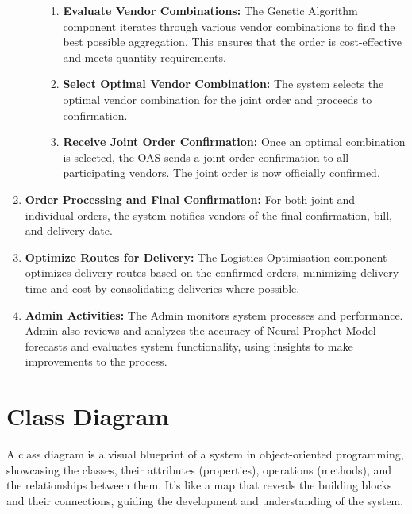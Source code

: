 \begin{enumerate}
\begin{itemize}
\begin{enumerate}
                        \item \textbf{Evaluate Vendor Combinations:} The Genetic Algorithm component iterates through various vendor combinations to find the best possible aggregation. This ensures that the order is cost-effective and meets quantity requirements.
                        \item \textbf{Select Optimal Vendor Combination:} The system selects the optimal vendor combination for the joint order and proceeds to confirmation.
                        \item \textbf{Receive Joint Order Confirmation:} Once an optimal combination is selected, the OAS sends a joint order confirmation to all participating vendors. The joint order is now officially confirmed.
                    \end{enumerate}
          \end{itemize}
    \item \textbf{Order Processing and Final Confirmation:} For both joint and individual orders, the system notifies vendors of the final confirmation, bill, and delivery date.
    \item \textbf{Optimize Routes for Delivery:} The Logistics Optimisation component optimizes delivery routes based on the confirmed orders, minimizing delivery time and cost by consolidating deliveries where possible.
    \item \textbf{Admin Activities:} The Admin monitors system processes and performance. Admin also reviews and analyzes the accuracy of Neural Prophet Model forecasts and evaluates system functionality, using insights to make improvements to the process.
\end{enumerate}
\section{Class Diagram}

A class diagram is a visual blueprint of a system in object-oriented programming, showcasing the classes, their attributes (properties), operations (methods), and the relationships between them. It’s like a map that reveals the building blocks and their connections, guiding the development and understanding of the system.

